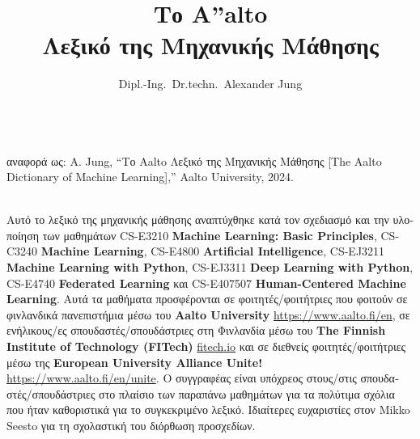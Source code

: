 \documentclass[journal,12pt,onecolumn]{article}
\begin{document}

\title {\vspace*{10mm}
	{\huge {\bf \foreignlanguage{greek}{Το} {\fontsize{40}{48}\selectfont \textbf{\textsf{A\hspace*{-2mm}''}}}\hspace*{-4mm}alto \\ \foreignlanguage{greek}{Λεξικό της Μηχανικής Μάθησης}}}  \\[-5mm] 
}

\author{Dipl.-Ing.\ Dr.techn.\ Alexander Jung \\[-6mm]%
}

\maketitle
	\begin{center}
	\\[3mm]
	\foreignlanguage{greek}{αναφορά ως}: A. Jung, ``\foreignlanguage{greek}{Το} Aalto \foreignlanguage{greek}{Λεξικό της Μηχανικής Μάθησης} [The Aalto Dictionary of Machine Learning],'' Aalto University, 2024.
\end{center}

\newpage 
{}\\ 

\noindent \foreignlanguage{greek}{Αυτό το λεξικό της μηχανικής μάθησης αναπτύχθηκε κατά τον σχεδιασμό και την υλοποίηση των μαθημάτων} CS-E3210 {\bf Machine Learning: Basic Principles}, CS-C3240 {\bf Machine Learning}, CS-E4800 {\bf Artificial Intelligence}, CS-EJ3211 {\bf Machine Learning with Python}, CS-EJ3311 {\bf Deep Learning with Python}, CS-E4740 {\bf Federated Learning}
\foreignlanguage{greek}{και} CS-E407507 {\bf Human-Centered Machine Learning}. \foreignlanguage{greek}{Αυτά τα μαθήματα προσφέρονται σε φοιτητές/φοιτήτριες που φοιτούν σε φινλανδικά πανεπιστήμια μέσω του} {\bf Aalto University} \url{https://www.aalto.fi/en}, \foreignlanguage{greek}{σε ενήλικους/ες σπουδαστές/σπουδάστριες στη Φινλανδία μέσω του} {\bf The Finnish Institute of Technology (FITech)} \url{fitech.io} \foreignlanguage{greek}{και σε διεθνείς φοιτητές/φοιτήτριες μέσω της} {\bf European University Alliance Unite!} \url{https://www.aalto.fi/en/unite}. \foreignlanguage{greek}{Ο συγγραφέας είναι υπόχρεος στους/στις σπουδαστές/σπουδάστριες στο πλαίσιο των παραπάνω μαθημάτων για τα πολύτιμα σχόλια που ήταν καθοριστικά για το συγκεκριμένο λεξικό. Ιδιαίτερες ευχαριστίες στον} Mikko Seesto \foreignlanguage{greek}{για τη σχολαστική του διόρθωση προσχεδίων}. 
\end{document}
